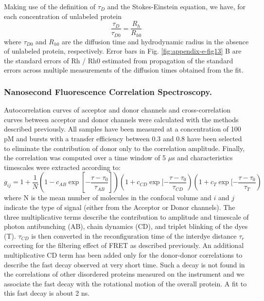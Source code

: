 \documentclass[../main.tex]{subfiles}
\begin{document}
        Making use of the definition of $\tau_D$ and the Stokes-Einstein equation, we have, for each concentration of unlabeled protein 
        \begin{equation}\label{appendix-e-eq10}
            \frac{\tau_D}{\tau_{D0}}=\frac{R_h}{R_{h0}}
        \end{equation}
        where $\tau_{D0}$ and $R_{h0}$ are the diffusion time and hydrodynamic radius in the absence of unlabeled protein, respectively. Error bars in Fig. \ref{fig:appendix-e-fig13} B are the standard errors of Rh / Rh0 estimated from propagation of the standard errors across multiple measurements of the diffusion times obtained from the fit.

    \subsubsection{Nanosecond Fluorescence Correlation Spectroscopy.}
        Autocorrelation curves of acceptor and donor channels and cross-correlation curves between acceptor and donor channels were calculated with the methods described previously\cite{Nettels2007-lf,Nettels2008-jk}. All samples have been measured at a concentration of 100 pM and bursts with a transfer efficiency between 0.3 and 0.8 have been selected to eliminate the contribution of donor only to the correlation amplitude. Finally, the correlation was computed over a time window of 5 $\mu$s and characteristics timescales were extracted according to: 
        \begin{equation}\label{appendix-e-eq11}
            g_{ij} = 1+\frac{1}{N}(1-c_{AB}\exp[-\frac{\tau - \tau_0}{\tau_{AB}}])(1+c_{CD}\exp[-\frac{\tau - \tau_0}{\tau_{CD}})(1+c_{T}\exp[-\frac{\tau - \tau_0}{\tau_{T}})
        \end{equation}
        where N is the mean number of molecules in the confocal volume and $i$ and $j$ indicate the type of signal (either from the Acceptor or Donor channels). The three multiplicative terms describe the contribution to amplitude and timescale of photon antibunching (AB), chain dynamics (CD), and triplet blinking of the dyes (T). $\tau_{CD}$ is then converted in the reconfiguration time of the interdye distance $\tau_r$ correcting for the filtering effect of FRET as described previously\cite{Gopich2009-ow}. An additional multiplicative CD term has been added only for the donor-donor correlations to describe the fast decay observed at very short time. Such a decay is not found in the correlations of other disordered proteins measured on the instrument and we associate the fast decay with the rotational motion of the overall protein. A fit to this fast decay is about 2 ns. 
\end{document}
